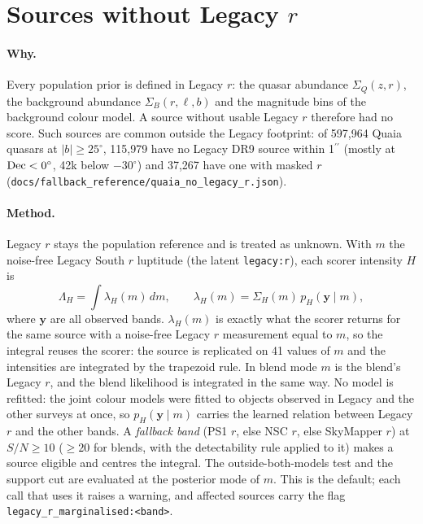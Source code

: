 \documentclass[11pt,a4paper]{article}
\newcommand{\vect}[1]{\boldsymbol{#1}}
\newcommand{\code}[1]{\texttt{#1}}
\begin{document}
\clearpage
\section{Sources without Legacy $r$}\label{sec:nolegacy}
\paragraph{Why.} Every population prior is defined in Legacy $r$: the quasar abundance $\Sigma_Q(z,r)$, the
background abundance $\Sigma_B(r,\ell,b)$ and the magnitude bins of the background colour model. A source
without usable Legacy $r$ therefore had no score. Such sources are common outside the Legacy footprint: of
597,964 Quaia quasars \citep[$G<20$;][]{StoreyFisher2024} at $|b|\geq25^\circ$, 115,979 have no Legacy DR9 source within
1$^{\prime\prime}$ (mostly at ${\rm Dec}<0^\circ$, 42k below $-30^\circ$) and 37,267 have one with masked $r$
(\code{docs/fallback\_reference/quaia\_no\_legacy\_r.json}).

\paragraph{Method.} Legacy $r$ stays the population reference and is treated as unknown. With $m$ the
noise-free Legacy South $r$ luptitude (the latent \code{legacy:r}), each scorer intensity $H$ is
\begin{equation}
\Lambda_H=\int \lambda_H(m)\,dm,\qquad \lambda_H(m)=\Sigma_H(m)\,p_H(\vect{y}\mid m),
\label{eq:nolegacy}
\end{equation}
where $\vect{y}$ are all observed bands. $\lambda_H(m)$ is exactly what the scorer returns for the same source
with a noise-free Legacy $r$ measurement equal to $m$, so the integral reuses the scorer: the source is
replicated on 41 values of $m$ and the intensities are integrated by the trapezoid rule. In blend mode $m$ is
the blend's Legacy $r$, and the blend likelihood is integrated in the same way. No model is refitted: the
joint colour models were fitted to objects observed in Legacy and the other surveys at once, so
$p_H(\vect{y}\mid m)$ carries the learned relation between Legacy $r$ and the other bands. A \emph{fallback band}
(PS1 $r$, else NSC $r$, else SkyMapper $r$) at $S/N\geq10$ ($\geq20$ for blends, with the detectability rule
applied to it) makes a source eligible and centres the integral. The outside-both-models test and the
support cut are evaluated at the posterior mode of $m$. This is the default; each call that uses it raises a
warning, and affected sources carry the flag \code{legacy\_r\_marginalised:<band>}.
\end{document}
